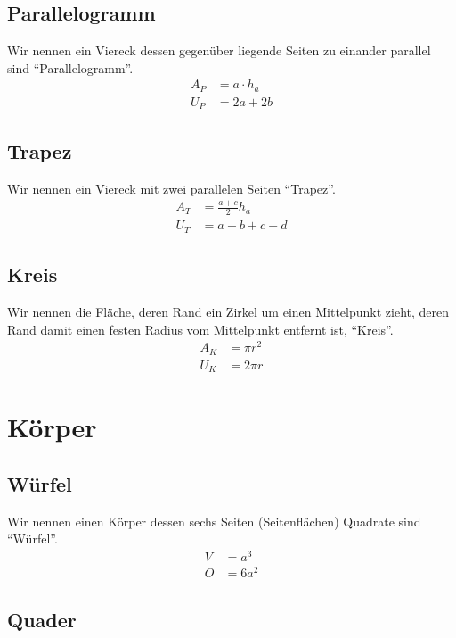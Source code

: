\documentclass[a4paper]{book}%
\theoremstyle{definition}
\begin{document}
\subsection{Parallelogramm}

Wir nennen ein Viereck dessen gegenüber liegende Seiten zu einander parallel sind \enquote{Parallelogramm}.
\begin{align}\label{eqn:fsPrallelogramm}
  A_P &= a \cdot h_a \\
  U_P &= 2a + 2b
\end{align}

\subsection{Trapez}

Wir nennen ein Viereck mit zwei parallelen Seiten \enquote{Trapez}.
\begin{align}\label{eqn:fsTrapez}
  A_T &= \frac{a+c}{2} h_a \\
  U_T &= a+b+c+d
\end{align}


\subsection{Kreis}

Wir nennen die Fläche, deren Rand ein Zirkel um einen Mittelpunkt zieht, deren Rand damit einen festen Radius vom Mittelpunkt entfernt ist, \enquote{Kreis}.
\begin{align}\label{eqn:fsKreis}
  A_K &= \pi r^2 \\
  U_K &= 2 \pi r
\end{align}



\section{Körper}


\subsection{Würfel}

Wir nennen einen Körper dessen sechs Seiten (Seitenflächen) Quadrate sind \enquote{Würfel}.
\begin{align}\label{eqn:fsWuerfel}
  V &= a^3 \\
  O &= 6a^2
\end{align}


\subsection{Quader}
\end{document}
